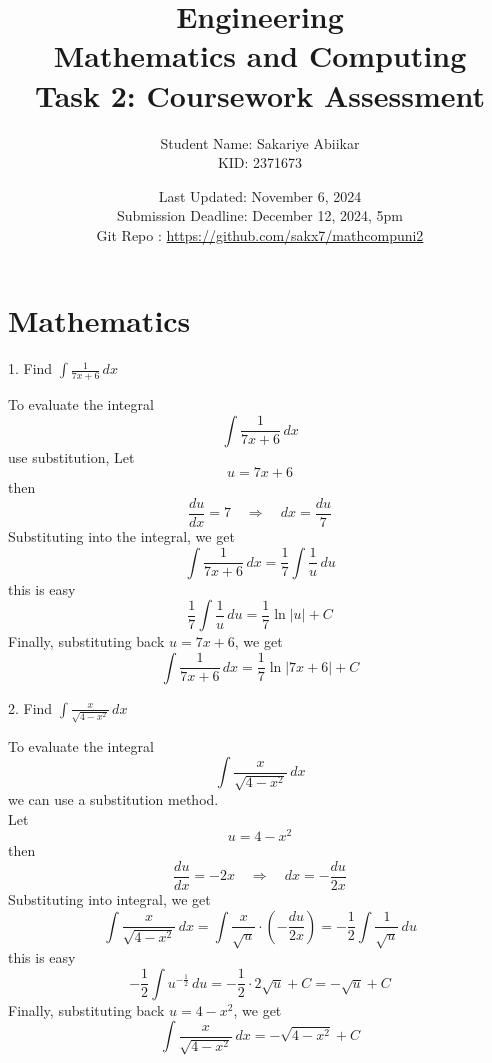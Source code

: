\documentclass[a4paper, 12pt]{report}
\title{\vspace{3em} \Huge \textbf{Engineering\\ Mathematics and Computing}\\ \vspace{1em} \Large Task 2: Coursework Assessment}
\author{Student Name: Sakariye Abiikar\\ KID: 2371673}
\date{Last Updated: November 6, 2024\\ Submission Deadline: December 12, 2024, 5pm \\[1em] Git Repo : \color{blue}\url{https://github.com/sakx7/mathcompuni2}}
\def\ni{green!60!black!40!white}
\begin{document}
    
    \maketitle
    \thispagestyle{empty}
    
    \newpage
    \thispagestyle{empty}
    
    \chapter{Mathematics}
    
    \newpage\centering\restoregeometry
    
    \setcounter{page}{1}
    
    
    \begin{tcolorbox}[title={\color{black}\section{Q1}}, colback=white, colframe=\ni, boxrule=1mm, width=1\textwidth]
        1. Find \( \int \frac{1}{7x + 6} \, dx \)
    \end{tcolorbox}
    To evaluate the integral 
    \[\int \frac{1}{7x + 6} \, dx\]
    use substitution, Let 
    \[u = 7x + 6\]
    then 
    \[\frac{du}{dx} = 7 \quad \Rightarrow \quad dx = \frac{du}{7}\]
    Substituting into the integral, we get
    \[\int \frac{1}{7x + 6} \, dx = \frac{1}{7} \int \frac{1}{u} \, du\]
    this is easy
    \[\frac{1}{7} \int \frac{1}{u} \, du = \frac{1}{7} \ln |u| + C\]
    Finally, substituting back \( u = 7x + 6 \), we get
    \[\boxed{\int \frac{1}{7x + 6} \, dx = \frac{1}{7} \ln |7x + 6| + C}\]
    
    
    \newpage
    
    \begin{tcolorbox}[title={\color{black}\section{Q2}}, colback=white, colframe=\ni, boxrule=1mm, width=1\textwidth]
        2. Find \( \int \frac{x}{\sqrt{4 - x^2}} \, dx \)
    \end{tcolorbox}
    
    To evaluate the integral 
    \[\int \frac{x}{\sqrt{4 - x^2}} \, dx\]
    we can use a substitution method.\\ Let\\[-1.5em] 
    \[u = 4 - x^2\]
    then 
    \[\frac{du}{dx} = -2x \quad \Rightarrow \quad dx = -\frac{du}{2x}\]
    Substituting into integral, we get
    \[\int \frac{x}{\sqrt{4 - x^2}} \, dx = \int \frac{x}{\sqrt{u}} \cdot \left(-\frac{du}{2x}\right) = -\frac{1}{2} \int \frac{1}{\sqrt{u}} \, du\]
    this is easy
    \[-\frac{1}{2} \int u^{-\frac{1}{2}} \, du = -\frac{1}{2} \cdot 2 \sqrt{u} + C = -\sqrt{u} + C\]
    Finally, substituting back \( u = 4 - x^2 \), we get
    \[\boxed{\int \frac{x}{\sqrt{4 - x^2}} \, dx = -\sqrt{4 - x^2} + C}\]
    
\end{document}

